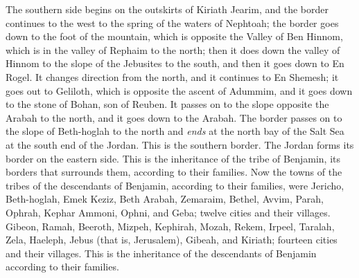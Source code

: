 \begin{biblechapter}
\verse The southern side begins on the outskirts of Kiriath Jearim, and the border continues to the west to the spring of the waters of Nephtoah;
\verse the border goes down to the foot of the mountain, which is opposite the Valley of Ben Hinnom, which is in the valley of Rephaim to the north; then it does down the valley of Hinnom to the slope of the Jebusites to the south, and then it goes down to En Rogel.
\verse It changes direction from the north, and it continues to En Shemesh; it goes out to Geliloth, which is opposite the ascent of Adummim, and it goes down to the stone of Bohan, son of Reuben.
\verse It passes on to the slope opposite the Arabah to the north, and it goes down to the Arabah.
\verse The border passes on to the slope of Beth-hoglah to the north and \textit{ends} at the north bay of the Salt Sea at the south end of the Jordan. This is the southern border.
\verse The Jordan forms its border on the eastern side. This is the inheritance of the tribe of Benjamin, its borders that surrounds them, according to their families.
\verse Now the towns of the tribes of the descendants of Benjamin, according to their families, were Jericho, Beth-hoglah, Emek Keziz,
\verse Beth Arabah, Zemaraim, Bethel,
\verse Avvim, Parah, Ophrah,
\verse Kephar Ammoni, Ophni, and Geba; twelve cities and their villages.
\verse Gibeon, Ramah, Beeroth,
\verse Mizpeh, Kephirah, Mozah,
\verse Rekem, Irpeel, Taralah,
\verse Zela, Haeleph, Jebus (that is, Jerusalem), Gibeah, and Kiriath; fourteen cities and their villages. This is the inheritance of the descendants of Benjamin according to their families.
\end{biblechapter}

